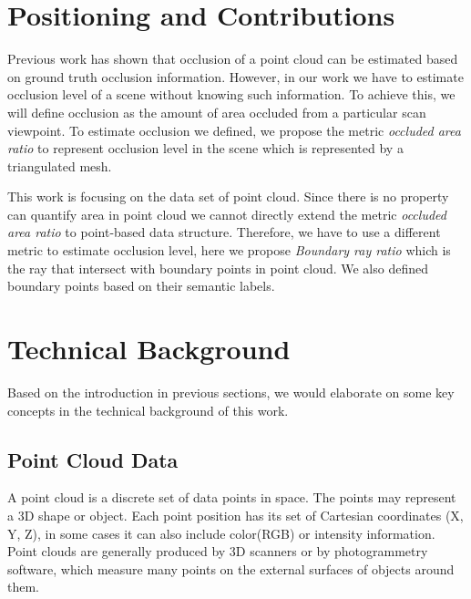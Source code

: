 \documentclass[11pt, a4paper,oneside,chapterprefix=false]{scrbook}
\begin{document}
\section{Positioning and Contributions}

Previous work has shown that occlusion of a point cloud can be estimated based on ground truth occlusion information. However, in our work we have to estimate occlusion level of a scene without knowing such information. To achieve this, we will define occlusion as the amount of area occluded from a particular scan viewpoint. To estimate occlusion we defined, we propose the metric \emph{occluded area ratio} to represent occlusion level in the scene which is represented by a triangulated mesh. 

\vspace{10pt}

This work is focusing on the data set of point cloud. Since there is no property can quantify area in point cloud we cannot directly extend the metric \emph{occluded area ratio} to point-based data structure. Therefore, we have to use a different metric to estimate occlusion level, here we propose \emph{Boundary ray ratio} which is the ray that intersect with boundary points in point cloud. We also defined boundary points based on their semantic labels.

\section{Technical Background}

Based on the introduction in previous sections, we would elaborate on some key concepts in the technical background of this work.

\subsection{Point Cloud Data}

A point cloud is a discrete set of data points in space. The points may represent a 3D shape or object. Each point position has its set of Cartesian coordinates (X, Y, Z), in some cases it can also include color(RGB) or intensity information. Point clouds are generally produced by 3D scanners or by photogrammetry software, which measure many points on the external surfaces of objects around them. 

\vspace{10pt}
\end{document}
